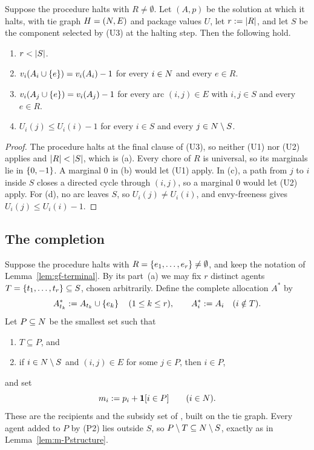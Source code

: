 \begin{lemma}
\label{lem:gf-terminal}
Suppose the procedure halts with $R\ne\emptyset$. Let $(A,p)$ be the solution at
which it halts, with tie graph $H=(N,E)$ and package values $U$, let
$r:=\left\lvert R\right\rvert$, and let $S$ be the component selected by (U3) at the halting step.
Then the following hold.
\begin{enumerate}
  \item[(a)] $r<\left\lvert S\right\rvert$.
  \item[(b)] $v_i(A_i\cup\left\{e\right\})=v_i(A_i)-1$ for every $i\in N$ and every
    $e\in R$.
  \item[(c)] $v_i(A_j\cup\left\{e\right\})=v_i(A_j)-1$ for every arc $(i,j)\in E$ with
    $i,j\in S$ and every $e\in R$.
  \item[(d)] $U_i(j)\le U_i(i)-1$ for every $i\in S$ and every
    $j\in N\setminus S$.
\end{enumerate}
\end{lemma}

\begin{proof}
The procedure halts at the final clause of (U3), so neither (U1) nor (U2) applies
and $\left\lvert R\right\rvert<\left\lvert S\right\rvert$, which is (a). Every chore of $R$ is universal, so its
marginals lie in $\left\{0,-1\right\}$. A marginal $0$ in (b) would let (U1) apply. In
(c), a path from $j$ to $i$ inside $S$ closes a directed cycle through $(i,j)$,
so a marginal $0$ would let (U2) apply. For (d), no arc leaves $S$, so
$U_i(j)\ne U_i(i)$, and envy-freeness gives $U_i(j)\le U_i(i)-1$.
\end{proof}

\subsection{The completion}
\label{sec:gf-completion}

Suppose the procedure halts with $R=\left\{e_1,\dots,e_r\right\}\ne\emptyset$, and keep the
notation of Lemma~\ref{lem:gf-terminal}. By its part~(a) we may fix $r$ distinct
agents $T=\left\{t_1,\dots,t_r\right\}\subseteq S$, chosen arbitrarily. Define the complete
allocation $A^\ast$ by
\[
  A^\ast_{t_k}:=A_{t_k}\cup\left\{e_k\right\}\quad(1\le k\le r),
  \qquad
  A^\ast_i:=A_i\quad(i\notin T).
\]
Let $P\subseteq N$ be the smallest set such that
\begin{enumerate}
  \item[(P1)] $T\subseteq P$, and
  \item[(P2)] if $i\in N\setminus S$ and $(i,j)\in E$ for some $j\in P$,
    then $i\in P$,
\end{enumerate}
and set
\begin{equation}
\label{eq:gf-m}
  m_i:=p_i+\mathbf{1}[i\in P]
  \qquad (i\in N).
\end{equation}
These are the recipients and the subsidy set of , built on
the tie graph. Every agent added to $P$ by (P2) lies outside $S$, so
$P\setminus T\subseteq N\setminus S$, exactly as in
Lemma~\ref{lem:m-Pstructure}.

